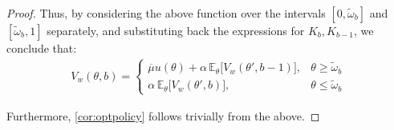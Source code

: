 \begin{proof}
    Thus, by considering the above function over the intervals $[0, \widetilde\omega_b]$ and $[\widetilde\omega_b, 1]$ separately, and substituting back the expressions for $K_b, K_{b-1}$, we conclude that:
    \begin{equation*}
    \begin{split}
        V_w(\theta,b)=\begin{cases}
            \overline\mu u(\theta) +\alpha \,\mathbb{E}_{\theta}\Big[V_w(\theta', b-1)\Big],& \theta \geq \widetilde \omega_b \\[10pt]
            \alpha \,\mathbb{E}_{\theta}\Big[V_w(\theta', b)\Big],& \theta\leq\widetilde \omega_b
        \end{cases} 
    \end{split}
    \end{equation*} 

    Furthermore, \autoref{cor:optpolicy} follows trivially from the above. 
\begin{comment} 
    When a woman with budget $b$ is presented a candidate with attractiveness $\theta \geq \widetilde\omega_b$ and she swipes right, her expected lifetime sum of discounted payoffs is:
    \begin{equation*}
        \begin{split}
            \overline\mu u(\theta) +\alpha \,\mathbb{E}_{\theta}\Big[V_w(\theta', b-1)\Big]\\
            = V_w(\theta,b)
        \end{split}
    \end{equation*}
    Alternatively, when presented a candidate with attractiveness $\theta<\widetilde\omega_b$ and she swipes left:
    \begin{equation*}
        \begin{split}
            \alpha \,\mathbb{E}_{\theta}\Big[V_w(\theta', b)\Big]\\
            = V_w(\theta,b)
        \end{split}
    \end{equation*} 
\end{comment}
\end{proof}

